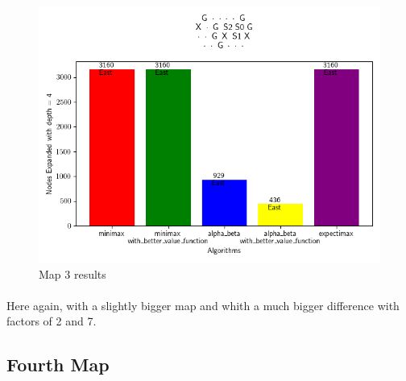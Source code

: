 \documentclass{article}
\begin{document}
\begin{figure}[h]
    \centering
    \includegraphics[width=\textwidth]{media/map2023_10_29_13_53_25.png}
    \caption{Map 3 results}
    \label{fig:image3}
\end{figure}
\vspace{1em}

\paragraph{}
Here again, with 
a slightly bigger map and whith 
a much bigger difference with factors of 2 and 7.

\newpage
\subsection{Fourth Map}
\end{document}
